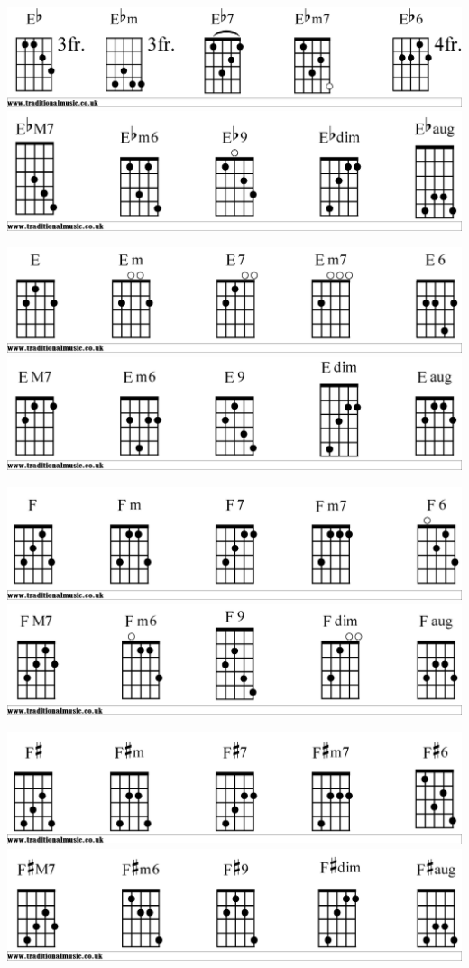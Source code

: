 \includegraphics[scale=.15]{chords/Ebbjo1}
\includegraphics[scale=.15]{chords/Ebbjo2}

\includegraphics[scale=.15]{chords/Ebjo1}
\includegraphics[scale=.15]{chords/Ebjo2}

\includegraphics[scale=.15]{chords/Fbjo1}
\includegraphics[scale=.15]{chords/Fbjo2}

\includegraphics[scale=.15]{chords/Fsbjo1}
\includegraphics[scale=.15]{chords/Fsbjo2}

